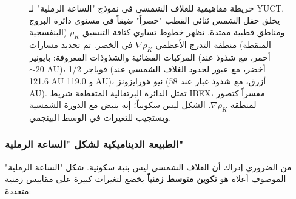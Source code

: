 \documentclass[11pt,a4paper]{article}
\theoremstyle{remark}
\begin{document}
\begin{figure}[htbp]
		\caption{خريطة مفاهيمية للغلاف الشمسي في نموذج "الساعة الرملية" لـ YUCT. يخلق حقل الشمس ثنائي القطب "خصراً" ضيقاً في مستوى دائرة البروج ومناطق قطبية ممتدة. تظهر خطوط تساوي كثافة التنسيق $\rho_K$ (البنفسجية المنقطة) منطقة التدرج الأعظمي $\nabla\rho_K$ في الخصر. تم تحديد مسارات المركبات الفضائية والشذوذات المعروفة: بايونير (أحمر، مع شذوذ عند $\sim20$ AU)، فوياجر 1/2 (أخضر، مع عبور لحدود الغلاف الشمسي عند 121.6 AU و 119.0 AU)، نيو هورايزونز (أزرق، مع شذوذ غبار عند 58 AU). تمثل الدائرة البرتقالية المتقطعة شريط IBEX، مفسراً كتصور لمنطقة $\nabla\rho_K$. الشكل ليس سكونياً؛ إنه ينبض مع الدورة الشمسية ويستجيب للتغيرات في الوسط البينجمي.}
		\label{fig:coord:heliosphere_hourglass}
	\end{figure}
	
	\subsubsection{الطبيعة الديناميكية لشكل "الساعة الرملية"}
	\label{subsubsec:coord:dynamic}
	
	من الضروري إدراك أن الغلاف الشمسي ليس بنية سكونية. شكل "الساعة الرملية" الموصوف أعلاه هو \textbf{تكوين متوسط زمنياً} يخضع لتغيرات كبيرة على مقاييس زمنية متعددة:
	
\end{document}
